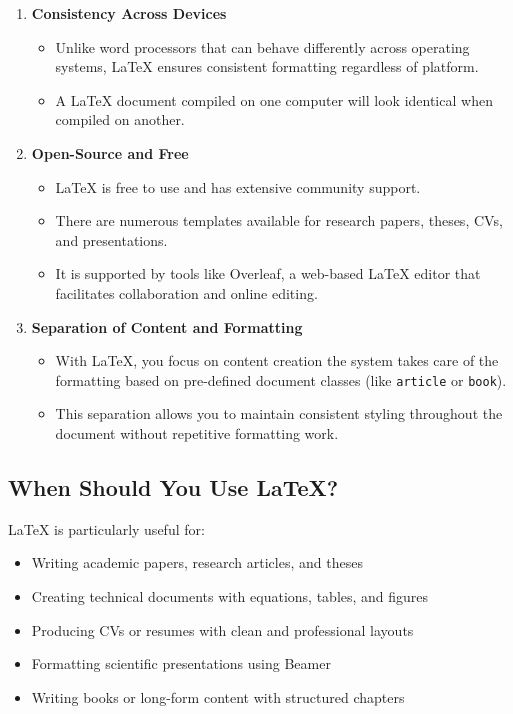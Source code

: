 \documentclass[12pt, oneside]{article}
\begin{document}
\begin{enumerate}
    \item \textbf{Consistency Across Devices}
    \begin{itemize}
        \item Unlike word processors that can behave differently across operating systems, \LaTeX{} ensures consistent formatting regardless of platform.
        \item A \LaTeX{} document compiled on one computer will look identical when compiled on another.
    \end{itemize}

    \item \textbf{Open-Source and Free}
    \begin{itemize}
        \item \LaTeX{} is free to use and has extensive community support.
        \item There are numerous templates available for research papers, theses, CVs, and presentations.
        \item It is supported by tools like Overleaf, a web-based \LaTeX{} editor that facilitates collaboration and online editing.
    \end{itemize}

    \item \textbf{Separation of Content and Formatting}
    \begin{itemize}
        \item With \LaTeX{}, you focus on content creation the system takes care of the formatting based on pre-defined document classes (like \texttt{article} or \texttt{book}).
        \item This separation allows you to maintain consistent styling throughout the document without repetitive formatting work.
    \end{itemize}
\end{enumerate}

\subsection{When Should You Use \LaTeX?}

\LaTeX{} is particularly useful for:
\begin{itemize}
    \item Writing academic papers, research articles, and theses
    \item Creating technical documents with equations, tables, and figures
    \item Producing CVs or resumes with clean and professional layouts
    \item Formatting scientific presentations using Beamer
    \item Writing books or long-form content with structured chapters
\end{itemize}
\end{document}
